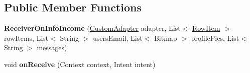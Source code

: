 \subsection*{Public Member Functions}
\begin{DoxyCompactItemize}
\item 
{\bfseries Receiver\+On\+Info\+Income} (\hyperlink{classcom_1_1example_1_1sebastian_1_1tindertp_1_1chatListTools_1_1CustomAdapter}{Custom\+Adapter} adapter, List$<$ \hyperlink{classcom_1_1example_1_1sebastian_1_1tindertp_1_1chatListTools_1_1RowItem}{Row\+Item} $>$ row\+Items, List$<$ String $>$ users\+Email, List$<$ Bitmap $>$ profile\+Pics, List$<$ String $>$ messages)\hypertarget{classcom_1_1example_1_1sebastian_1_1tindertp_1_1services_1_1ReceiverOnInfoIncome_ac04ec0945d0315ed294084946c646d22}{}\label{classcom_1_1example_1_1sebastian_1_1tindertp_1_1services_1_1ReceiverOnInfoIncome_ac04ec0945d0315ed294084946c646d22}

\item 
void {\bfseries on\+Receive} (Context context, Intent intent)\hypertarget{classcom_1_1example_1_1sebastian_1_1tindertp_1_1services_1_1ReceiverOnInfoIncome_a0268bbcf6daaee985ca7c8f7e3753681}{}\label{classcom_1_1example_1_1sebastian_1_1tindertp_1_1services_1_1ReceiverOnInfoIncome_a0268bbcf6daaee985ca7c8f7e3753681}

\end{DoxyCompactItemize}
